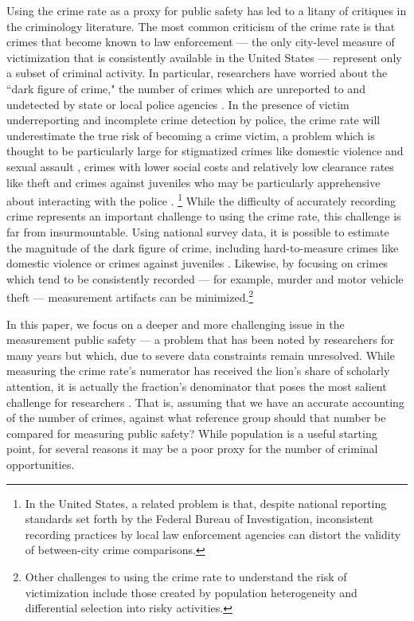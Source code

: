 Using the crime rate as a proxy for public safety has led to a litany of critiques in the criminology literature. The most common criticism of the crime rate is that crimes that become known to law enforcement --- the only city-level measure of victimization that is consistently available in the United States --- represent only a subset of criminal activity. In particular, researchers have worried about the ``dark figure of crime," the number of crimes which are unreported to and undetected by state or local police agencies \citep{biderman1967exploring, penney2014dark}. In the presence of victim underreporting and incomplete crime detection by police, the crime rate will underestimate the true risk of becoming a crime victim, a problem which is thought to be particularly large for stigmatized crimes like domestic violence and sexual assault \citep{felson2005reporting}, crimes with lower social costs and relatively low clearance rates like theft \citep{skogan1977dimensions} and crimes against juveniles who may be particularly apprehensive about interacting with the police \citep{finkelhor2001factors}.%
\footnote{In the United States, a related problem is that, despite national reporting standards set forth by the Federal Bureau of Investigation, inconsistent recording practices by local law enforcement agencies can distort the validity of between-city crime comparisons.} 
While the difficulty of accurately recording crime represents an important challenge to using the crime rate, this challenge is far from insurmountable. Using national survey data, it is possible to estimate the magnitude of the dark figure of crime, including hard-to-measure crimes like domestic violence \citep{bachman1994violence} or crimes against juveniles \citep{hashima1999violent}. Likewise, by focusing on crimes which tend to be consistently recorded --- for example, murder and motor vehicle theft --- measurement artifacts can be minimized.\footnote{Other challenges to using the crime rate to understand the risk of victimization include those created by population heterogeneity and differential selection into risky activities.}

In this paper, we focus on a deeper and more challenging issue in the measurement public safety --- a problem that has been noted by researchers for many years but which, due to severe data constraints remain unresolved. While measuring the crime rate's numerator has received the lion's share of scholarly attention, it is actually the fraction's denominator that poses the most salient challenge for researchers \citep{boggs1965urban}. That is, assuming that we have an accurate accounting of the number of crimes, against what reference group should that number be compared for measuring public safety? While population is a useful starting point, for several reasons it may be a poor proxy for the number of criminal opportunities. 

